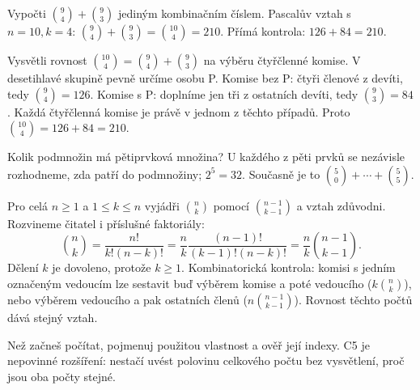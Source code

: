 \documentclass[11pt,a4paper]{article}
\begin{document}
\begin{prikladReseniBox}[title={Příklad P2}]
Vypočti \(\binom94+\binom93\) jediným kombinačním číslem.
\tcblower
Pascalův vztah s \(n=10,k=4\): \(\binom94+\binom93=\binom{10}4=210\). Přímá kontrola: \(126+84=210\).
\end{prikladReseniBox}


\begin{prikladReseniBox}[title={Příklad P3}]
Vysvětli rovnost \(\binom{10}4=\binom94+\binom93\) na výběru čtyřčlenné komise.
\tcblower
V desetihlavé skupině pevně určíme osobu P. Komise bez P: čtyři členové z devíti, tedy $\binom94=126$. Komise s P: doplníme jen tři z ostatních devíti, tedy $\binom93=84$. Každá čtyřčlenná komise je právě v jednom z těchto případů. Proto $\binom{10}4=126+84=210$.
\end{prikladReseniBox}


\begin{prikladReseniBox}[title={Příklad P4}]
Kolik podmnožin má pětiprvková množina?
\tcblower
U každého z pěti prvků se nezávisle rozhodneme, zda patří do podmnožiny; \(2^5=32\). Současně je to \(\binom50+\cdots+\binom55\).
\end{prikladReseniBox}


\begin{prikladReseniBox}[title={Příklad P5}]
Pro celá $n\geq1$ a $1\leq k\leq n$ vyjádři $\binom nk$ pomocí $\binom{n-1}{k-1}$ a vztah zdůvodni.
\tcblower
Rozvineme čitatel i příslušné faktoriály:
\[
 \binom nk=\frac{n!}{k!(n-k)!}
 =\frac nk\frac{(n-1)!}{(k-1)!(n-k)!}
 =\frac nk\binom{n-1}{k-1}.
\]
Dělení $k$ je dovoleno, protože $k\geq1$. Kombinatorická kontrola: komisi s jedním označeným vedoucím lze sestavit buď výběrem komise a poté vedoucího ($k\binom nk$), nebo výběrem vedoucího a pak ostatních členů ($n\binom{n-1}{k-1}$). Rovnost těchto počtů dává stejný vztah.
\end{prikladReseniBox}


\newpage
{}

Než začneš počítat, pojmenuj použitou vlastnost a ověř její indexy. C5 je nepovinné rozšíření: nestačí uvést polovinu celkového počtu bez vysvětlení, proč jsou oba počty stejné.
\end{document}

